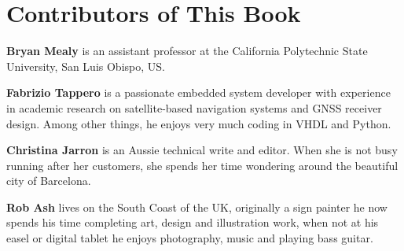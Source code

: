 %
%
%
\chapter*{Contributors of This Book}

\noindent
\textbf{Bryan Mealy} is an assistant professor at the California Polytechnic State University, San Luis Obispo, US.

\noindent
\textbf{Fabrizio Tappero} is a passionate embedded system developer with experience in academic research on satellite-based navigation systems and GNSS receiver design. Among other things, he enjoys very much coding in VHDL and Python.

\noindent
\textbf{Christina Jarron} is an Aussie technical write and editor. When she is not busy running after her customers, she spends her time wondering around the beautiful city of Barcelona. 

\noindent
\textbf{Rob Ash} lives on the South Coast of the UK, originally a sign painter he now spends his time completing art, design and illustration work, when not at his easel or digital tablet he enjoys photography, music and playing bass guitar.

